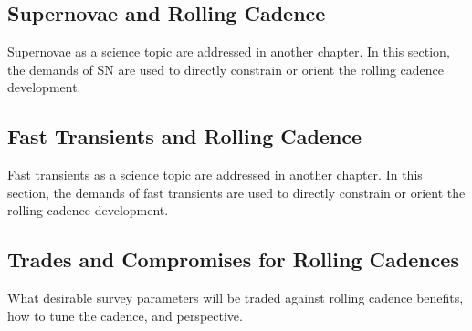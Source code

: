 \subsection{ Supernovae and Rolling Cadence}
\label{sec:rolling:supernovae}


Supernovae as a science topic are addressed in another chapter.
In this section, the demands of SN are used to directly constrain or
orient the rolling cadence development.


\subsection{ Fast Transients and Rolling Cadence}
\label{sec:rolling:transients}


Fast transients as a science topic are addressed in another chapter.
In this section, the demands of fast transients are used to directly constrain or
orient the rolling cadence development.


\subsection{ Trades and Compromises for Rolling Cadences}
\label{sec:rolling:trades}

What desirable survey parameters will be traded against rolling cadence benefits, how to tune the cadence, and
perspective.


% 
% 
% 

